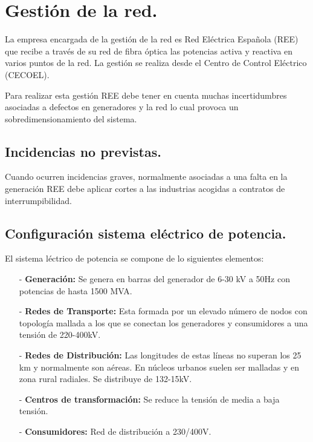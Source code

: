 \section{Gestión de la red.}
La empresa encargada de la gestión de la red es Red Eléctrica Española (REE) que recibe a través de su red de fibra óptica las potencias activa y reactiva en varios puntos de la red. La gestión se realiza desde el Centro de Control Eléctrico (CECOEL).

Para realizar esta gestión REE debe tener en cuenta muchas incertidumbres asociadas a defectos en generadores y la red lo cual provoca un sobredimensionamiento del sistema.
\subsection{Incidencias no previstas.}
Cuando ocurren incidencias graves, normalmente asociadas a una falta en la generación REE debe aplicar cortes a las industrias acogidas a contratos de interrumpibilidad.
\subsection{Configuración sistema eléctrico de potencia.}
El sistema léctrico de potencia se compone de lo siguientes elementos:
\begin{itemize}
	\item [-] \textbf{Generación:} Se genera en barras del generador de 6-30 kV a 50Hz con potencias de hasta 1500 MVA.
	\item [-] \textbf{Redes de Transporte:} Esta formada por un elevado número de nodos con topología mallada a los que se conectan los generadores y consumidores a una tensión de 220-400kV.
	\item [-] \textbf{Redes de Distribución:}  Las longitudes de estas líneas no superan los 25 km y normalmente son aéreas. En núcleos urbanos suelen ser malladas y en zona rural radiales. Se distribuye de 132-15kV.
	\item [-] \textbf{Centros de transformación:} Se reduce la tensión de media a baja tensión.
	\item [-] \textbf{Consumidores:} Red de distribución a 230/400V.
\end{itemize}
